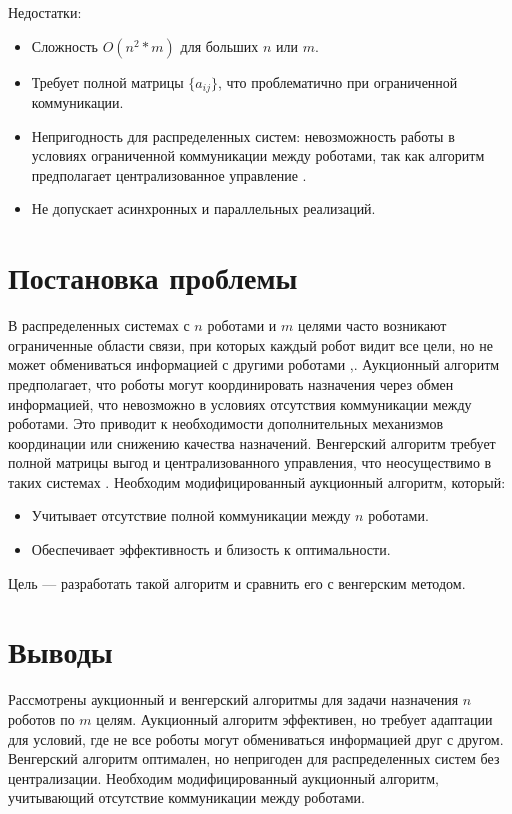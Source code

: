 Недостатки:
\begin{itemize}
    \item Сложность \( O(n^2*m) \) для больших \( n \) или \( m \).
    \item Требует полной матрицы \( \{a_{ij}\} \), что проблематично при ограниченной коммуникации.
    \item Непригодность для распределенных систем: невозможность работы в условиях ограниченной коммуникации между роботами, так как алгоритм предполагает централизованное управление \cite{kalyaev2009}.
    \item Не допускает асинхронных и параллельных реализаций.
\end{itemize}

\section{Постановка проблемы}
В распределенных системах с \( n \) роботами и \( m \) целями часто возникают ограниченные области связи, при которых каждый робот видит все цели, но не может обмениваться информацией с другими роботами \cite{kalyaev2009},\cite{gerkey2003}. Аукционный алгоритм \cite{bertsekas1990} предполагает, что роботы могут координировать назначения через обмен информацией, что невозможно в условиях отсутствия коммуникации между роботами. Это приводит к необходимости дополнительных механизмов координации или снижению качества назначений. Венгерский алгоритм \cite{kuhn1955} требует полной матрицы выгод и централизованного управления, что неосуществимо в таких системах \cite{kalyaev2009}. Необходим модифицированный аукционный алгоритм, который:

\begin{itemize}
    \item Учитывает отсутствие полной коммуникации между \( n \) роботами.
    \item Обеспечивает эффективность и близость к оптимальности.
\end{itemize}

Цель --- разработать такой алгоритм и сравнить его с венгерским методом.

\section{Выводы}
Рассмотрены аукционный \cite{bertsekas1990} и венгерский \cite{kuhn1955} алгоритмы для задачи назначения \( n \) роботов по \( m \) целям. Аукционный алгоритм эффективен, но требует адаптации для условий, где не все роботы могут обмениваться информацией друг с другом. Венгерский алгоритм оптимален, но непригоден для распределенных систем без централизации. Необходим модифицированный аукционный алгоритм, учитывающий отсутствие коммуникации между роботами.


